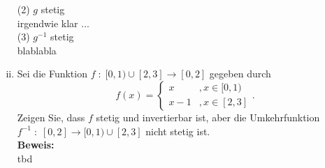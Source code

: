 \begin{enumerate}[(i)]
        (2) $g$ stetig \\
            irgendwie klar ... \\

        (3) $g^{-1}$ stetig\\
            blablabla
    
    \item Sei die Funktion $f \; : \; [0,1) \cup [2,3] \rightarrow [0,2]$ gegeben durch
        $$
            f(x) = \left\{ \begin{array}{lr}
                x &, x\in [0,1)\\
                x-1 &, x \in [2,3]
            \end{array} \right. .
        $$
        Zeigen Sie, dass $f$ stetig und invertierbar ist, aber die Umkehrfunktion 
        $f^{-1} \; : \; [0,2] \rightarrow [0,1) \cup [2,3]$ nicht stetig ist.\\

    \textbf{Beweis:}\\
        tbd
\end{enumerate}
